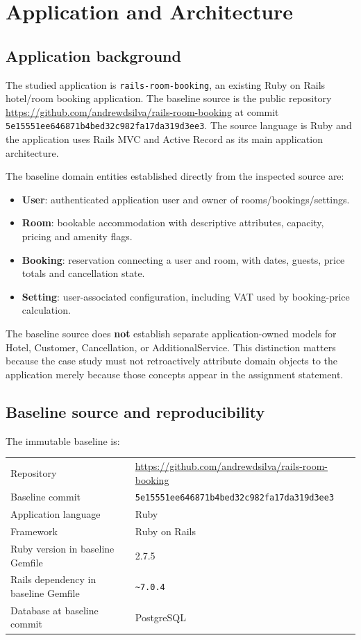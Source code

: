 \documentclass[10pt,a4paper]{article}
\newcommand{\code}[1]{\texttt{\small #1}}
\newcommand{\repo}{\url{https://github.com/andrewdsilva/rails-room-booking}}
\newcommand{\baseline}{\code{5e15551ee646871b4bed32c982fa17da319d3ee3}}
\begin{document}
\section{Application and Architecture}

\subsection{Application background}

The studied application is \code{rails-room-booking}, an existing Ruby on Rails hotel/room booking application. The baseline source is the public repository \repo{} at commit \baseline. The source language is Ruby and the application uses Rails MVC and Active Record as its main application architecture.

The baseline domain entities established directly from the inspected source are:

\begin{itemize}[leftmargin=*]
\item \textbf{User}: authenticated application user and owner of rooms/bookings/settings.
\item \textbf{Room}: bookable accommodation with descriptive attributes, capacity, pricing and amenity flags.
\item \textbf{Booking}: reservation connecting a user and room, with dates, guests, price totals and cancellation state.
\item \textbf{Setting}: user-associated configuration, including VAT used by booking-price calculation.
\end{itemize}

The baseline source does \textbf{not} establish separate application-owned models for Hotel, Customer, Cancellation, or AdditionalService. This distinction matters because the case study must not retroactively attribute domain objects to the application merely because those concepts appear in the assignment statement.

\subsection{Baseline source and reproducibility}

The immutable baseline is:

\begin{center}
\begin{tabular}{ll}
\toprule
Repository & \repo\\
Baseline commit & \baseline\\
Application language & Ruby\\
Framework & Ruby on Rails\\
Ruby version in baseline Gemfile & 2.7.5\\
Rails dependency in baseline Gemfile & \code{\textasciitilde7.0.4}\\
Database at baseline commit & PostgreSQL\\
\bottomrule
\end{tabular}
\end{center}
\end{document}
